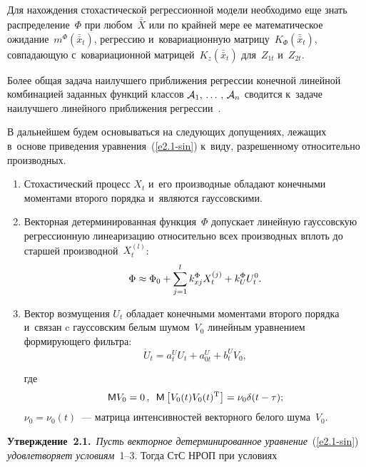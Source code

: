 \begin{multicols}{2}
\vspace*{-2pt}

\noindent
Для нахождения стохастической регрессионной модели необходимо еще знать распределение~$\Phi$ при 
любом~$\bar{\bar X}$ или по крайней мере ее математическое ожидание~$m^\Phi (\bar{\bar x}_t)$, 
 регрессию и~ковариационную матрицу~$K_\Phi (\bar{\bar x}_t)$, совпадающую с~ковариационной 
 матрицей~$K_{z}(\bar{\bar x}_t)$ для~$Z_{1t}$ и~$Z_{2t}$.

Более общая задача наилучшего приближения регрессии конечной линейной комбинацией заданных
 функций классов ${\cal A}_1,\,\ldots\,,\, {\cal A}_n$ сводится к~задаче наилучшего линейного приближения регрессии~\cite{7-sin}.

В дальнейшем будем основываться на сле\-ду\-ющих допущениях,
 лежащих в~основе приведения уравнения~(\ref{e2.1-sin}) к~виду, разрешенному относительно производных.
\begin{enumerate}[1.]
\item Стохастический процесс $X_t$ и~его производные обладают конечными моментами второго порядка и~являются гауссовскими.

\item Векторная детерминированная функция~$\Phi$ допускает линейную гауссовскую 
регрессионную линеаризацию относительно всех производных вплоть до  старшей производной~$X_t^{(l)}$:
   \begin{equation*}
   \Phi \approx\Phi_0 +\sum\limits_{j=1}^l  k_{xj}^\Phi X_t^{(j)} + k_U^\Phi U_t^0.
   \end{equation*}
   
   \vspace*{-2pt}

\item Вектор возмущения $U_t$ обладает конечными моментами второго порядка и~связан c гауссовским 
белым шумом~$V_0$ линейным уравнением формирующего фильтра:
\begin{equation}
\dot U_t = a_t^U U_t+ a_{0t}^U + b_t^U V_0,\label{e2.8-sin}
\end{equation}

\vspace*{-3pt}

\noindent
где
    $$
    \mathsf{M} V_0 =0\,, \enskip \mathsf{M} \left[ V_0 (t) V_0 (t)^{\mathrm{T}}\right] = \nu_0 \delta (t-\tau);
    $$
$\nu_0 =\nu_0(t)$~--- матрица интенсивностей векторного белого шума~$V_0$.
\end{enumerate}

\noindent
\textbf{Утверждение~2.1.}\ \textit{Пусть векторное детерминированное уравнение}~(\ref{e2.1-sin}) 
\textit{удовлетворяет условиям}~1--3. Тогда СтС НРОП при условиях


\end{multicols}

